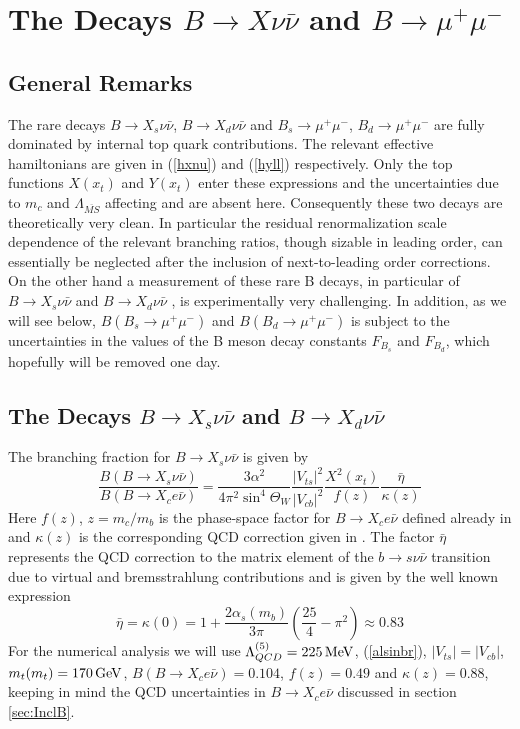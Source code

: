 \section{The Decays $B\to X\nu\bar\nu$ and $B\to\mu^+\mu^-$}
\label{sec:BXnnBmm}
\subsection{General Remarks}
\label{sec:BXnnBmm:General}
The rare decays $B\to X_{s}\nu\bar\nu$, $B\to X_{d}\nu\bar\nu$ and
$B_{s}\to\mu^+\mu^-$, $B_{d}\to\mu^+\mu^-$ are fully dominated by
internal top quark contributions. The relevant effective hamiltonians
are given in (\ref{hxnu}) and (\ref{hyll}) respectively.  Only the top
functions $X(x_t)$ and $Y(x_t)$ enter these expressions and the
uncertainties due to $m_c$ and $\Lambda_{\overline{MS}}$ affecting
\kpnn and \klmm are absent here.  Consequently these two decays are
theoretically very clean. In particular the residual renormalization
scale dependence of the relevant branching ratios, though sizable in
leading order, can essentially be neglected after the inclusion of
next-to-leading order corrections. On the other hand a measurement of
these rare B decays, in particular of $B\to X_{s}\nu\bar\nu$ and $B\to
X_{d}\nu\bar\nu$ , is experimentally very challenging. In addition, as
we will see below, $B(B_{s}\to\mu^+\mu^-)$ and $B(B_{d}\to\mu^+\mu^-)$
is subject to the uncertainties in the values of the B meson decay
constants $F_{B_{s}}$ and $F_{B_{d}}$, which hopefully will be removed
one day.

\subsection{The Decays $B\to X_{s}\nu\bar\nu$ and $B\to X_{d}\nu\bar\nu$}
\label{sec:BXnnBmm:BXnn}
The branching fraction for $B\to X_s\nu\bar\nu$ is given by
\begin{equation}\label{bbxnn}
\frac{B(B\to X_s\nu\bar\nu)}{B(B\to X_c e\bar\nu)}=
\frac{3 \alpha^2}{4\pi^2\sin^4\Theta_W}
\frac{|V_{ts}|^2}{|V_{cb}|^2}\frac{X^2(x_t)}{f(z)}
\frac{\bar\eta}{\kappa(z)}
\end{equation}
Here $f(z)$, $z=m_c/m_b$ is the phase-space factor for $B\to X_c
e\bar\nu$ defined already in  and $\kappa(z)$ is the
corresponding QCD correction \cite{CM:78} given in . The
factor $\bar\eta$ represents the QCD correction to the matrix element
of the $b\to s\nu\bar\nu$ transition due to virtual and bremsstrahlung
contributions and is given by the well known expression
\begin{equation}\label{etabar}
\bar\eta=\kappa(0)=
1+\frac{2\alpha_s(m_b)}{3\pi}\left(\frac{25}{4}-\pi^2\right)
\approx 0.83
\end{equation}
For the numerical analysis we will use $\Lambda^{(5)}_{QCD}=225\, {\rm MeV}$,
(\ref{alsinbr}), $|V_{ts}|=|V_{cb}|$, $m_t(m_t)=170\, {\rm GeV}$, $B(B\to X_c
e\bar\nu)=0.104$, $f(z)=0.49$ and $\kappa(z)=0.88$, keeping in mind
the QCD uncertainties in $B\to X_c e\bar\nu$ discussed in section
\ref{sec:InclB}.

